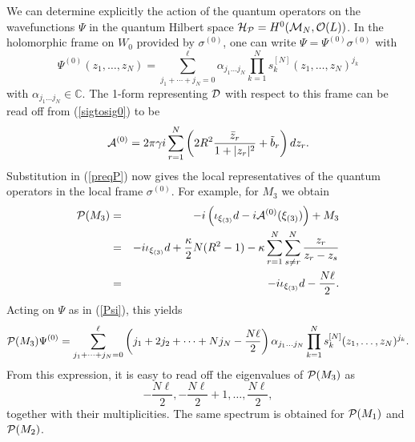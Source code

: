 \documentclass[a4paper,11pt]{article}
\begin{document}
We can determine explicitly the action of the
quantum operators on the wavefunctions $\Psi$ in the quantum Hilbert
space ${\cal H}_{\cal P}=H^{0}({\cal M}_{N},{\cal O}(L))$. 
In the holomorphic frame on $W_{0}$ provided by $\sigma^{(0)}$, 
one can write $\Psi=\Psi^{(0)}\sigma^{(0)}$ with
\begin{equation}\label{Psi}
\Psi^{(0)}(z_{1},\ldots,z_{N})=\sum
_{j_{1}+\cdots+j_{N}=0}
^{\ell} \alpha_{j_{1}\ldots j_{N}}
\prod_{k=1}^{N}s_{k}^{[N]}(z_{1},\ldots,z_{N})^{j_{k}}
\end{equation}
with $\alpha_{j_{1}\ldots j_{N}} \in \mathbb{C}$. The 1-form representing
${\cal D}$ with respect to this frame can be read off from
(\ref{sigtosig0}) to be
\[
{\cal A}^{(0)} = 2 \pi  \gamma i \sum_{r=1}^{N}
\left( 2 R^{2}\frac{\bar{z}_{r}}{1+|z_{r}|^{2}}+\tilde{b}_{r}\right)dz_{r}.
\]
Substitution in (\ref{preqP}) now gives the local representatives of 
the quantum operators in the local frame $\sigma^{(0)}$.
For example, for $M_{3}$ we obtain
\begin{eqnarray*}
{\cal P}(M_{3})&=&-i\left(\iota_{\xi_{(3)}}d-
i{\cal A}^{(0)}(\xi_{(3)})\right)+M_{3}\\
&=&-i\iota_{\xi_{(3)}}d+\frac{\kappa}{2} N(R^{2}-1)-\kappa
\sum_{r=1}^{N}\sum_{s\ne r}^{N}\frac{z_{r}}{z_{r}-z_{s}}\\
&=&-i\iota_{\xi_{(3)}}d-\frac{N \ell}{2}.
\end{eqnarray*}
Acting on $\Psi$ as in (\ref{Psi}), this yields
\begin{equation}\label{spec}
{\cal P}(M_{3})\Psi^{(0)}=\sum_{j_{1}+\cdots +j_{N}=0}^{\ell}
\left(j_{1}+2j_{2}+\cdots + Nj_{N}-\frac{N\ell}{2} \right)
\alpha_{j_{1}\ldots j_{N}}
\prod_{k=1}^{N}s_{k}^{[N]}(z_{1},\ldots,z_{N})^{j_{k}}.
\end{equation}
From this expression, it is easy to read off the eigenvalues of 
${\cal P}(M_{3})$ as
\[
-\frac{N\ell}{2},-\frac{N\ell}{2}+1,\ldots,\frac{N\ell}{2},
\]
together with their multiplicities. The same spectrum is obtained for
${\cal P}(M_{1})$ and ${\cal P}(M_{2})$.
\end{document}
